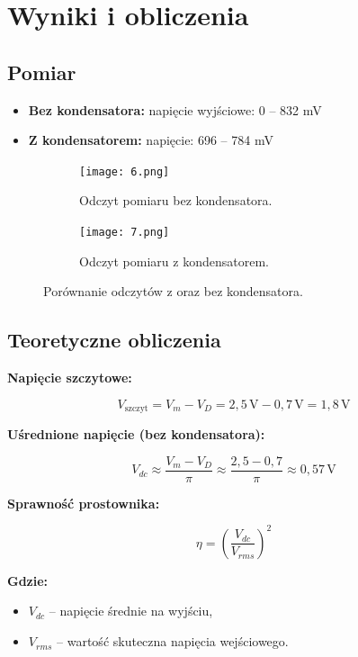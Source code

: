 \documentclass[a4paper,12pt]{article}
\begin{document}
\section*{Wyniki i obliczenia}

\subsection*{Pomiar}

\begin{itemize}
    \item \textbf{Bez kondensatora:} napięcie wyjściowe: 0 -- 832 mV
    \item \textbf{Z kondensatorem:} napięcie: 696 -- 784 mV
\end{itemize}
\begin{figure}[h]
    \centering
    \begin{subfigure}{0.45\textwidth}
        \centering
        \texttt{[image: 6.png]}
        \caption{Odczyt pomiaru bez kondensatora.}
        \label{fig:schemat1}
    \end{subfigure}
    \hfill
    \begin{subfigure}{0.45\textwidth}
        \centering
        \texttt{[image: 7.png]}
        \caption{Odczyt pomiaru z kondensatorem.}
        \label{fig:schemat2}
    \end{subfigure}
    \caption{Porównanie odczytów z oraz bez kondensatora.}
    \label{fig:porownanie}
\end{figure}
\subsection*{Teoretyczne obliczenia}

\textbf{Napięcie szczytowe:}

\[
V_{\text{szczyt}} = V_m - V_D = 2{,}5\,\text{V} - 0{,}7\,\text{V} = 1{,}8\,\text{V}
\]

\textbf{Uśrednione napięcie (bez kondensatora):}

\[
V_{dc} \approx \frac{ V_m- V_D}{\pi}  \approx \frac{2{,}5-0{,}7}{\pi} \approx  0{,}57\,\text{V}
\]

\textbf{Sprawność prostownika:}

\[
\eta = \left( \frac{V_{dc}}{V_{rms}} \right)^2
\]

\textbf{Gdzie:}

\begin{itemize}
    \item $V_{dc}$ – napięcie średnie na wyjściu,
    \item $V_{rms}$ – wartość skuteczna napięcia wejściowego.
\end{itemize}
\end{document}
